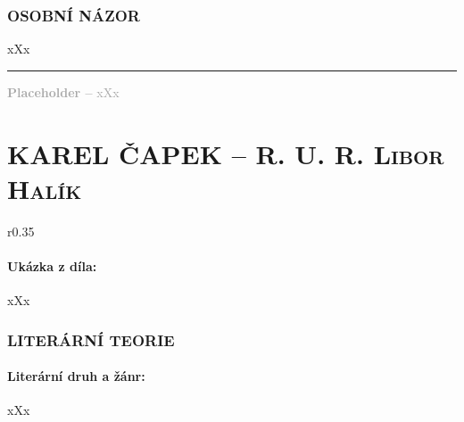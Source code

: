 \documentclass[A4paper]{extarticle} %
\begin{document}


\section*{OSOBNÍ NÁZOR}
\noindent 
xXx

\vfill

\noindent\begin{minipage}{\textwidth}
    \textcolor{darkgray}{\rule{\linewidth}{0.4pt}
    \footnotesize
    \textbf{Placeholder --} xXx
    }
\end{minipage}

\newpage


\changefontsize{8pt}

\part*{KAREL ČAPEK -- R. U. R. {\hfill \normalfont\tiny\textsc{Libor Halík}}}

\noindent\begin{wrapfigure}{r}{0.35\textwidth}
\tiny

\subsection*{Ukázka z díla:}
\setlength{\parindent}{3pt}
xXx
\end{wrapfigure}

\section*{LITERÁRNÍ TEORIE}

\subsection*{Literární druh a žánr:}
\noindent xXx


\end{document}

